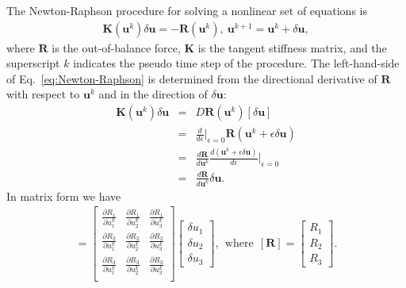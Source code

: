 \documentclass[12pt,aps,pre]{revtex4}
\begin{document}
The Newton-Raphson procedure for solving a nonlinear set of equations is \cite{JavierBonet:2008uxa}
%
\begin{eqnarray}
\pmb{K}(\pmb{u}^k) \delta \pmb{u} = - \pmb{R}(\pmb{u}^k), \ \pmb{u}^{k+1} = \pmb{u}^k + \delta \pmb{u},
\label{eq:Newton-Raphson}
\end{eqnarray}
%
where $\pmb{R}$ is the out-of-balance force, $\pmb{K}$ is the tangent stiffness matrix, and the superscript $k$ indicates the pseudo time step of the procedure. The left-hand-side of  Eq.\ \eqref{eq:Newton-Raphson} is determined from the directional derivative of $\pmb{R}$ with respect to $\pmb{u}^k$ and in the direction of $\delta \pmb{u}$:
%
\begin{eqnarray}
\pmb{K}(\pmb{u}^k) \delta \pmb{u} &=& D\pmb{R}(\pmb{u}^k)[\delta \pmb{u}] \nonumber\\
%
&=& \frac{d}{d\epsilon} \bigg|_{\epsilon=0}\pmb{R}(\pmb{u}^k + \epsilon \delta \pmb{u}) \nonumber\\
&=& \frac{d \pmb{R}}{d\pmb{u}^k} \frac{d(\pmb{u}^k + \epsilon \delta \pmb{u})}{d\epsilon} \bigg|_{\epsilon=0} \nonumber\\
&=& \frac{d \pmb{R}}{d\pmb{u}^k} \delta \pmb{u}.
\label{eq:DR[u]}
\end{eqnarray}
%
In matrix form we have
%
\begin{eqnarray}
[\pmb{K}(\pmb{u}^k)][\delta \pmb{u}] =
%
\begin{bmatrix}
\frac{\partial R_1}{\partial u_1^k} & \frac{\partial R_1}{\partial u_2^k} & \frac{\partial R_1}{\partial u_3^k} \\
%
\frac{\partial R_2}{\partial u_1^k} & \frac{\partial R_2}{\partial u_2^k} & \frac{\partial R_2}{\partial u_3^k} \\
%
\frac{\partial R_3}{\partial u_1^k} & \frac{\partial R_3}{\partial u_2^k} & \frac{\partial R_3}{\partial u_3^k} \\
\end{bmatrix}
%
\begin{bmatrix}
\delta u_1 \\ \delta u_2 \\ \delta u_3
\end{bmatrix}, \ \ \text{where} \ \ 
%
[\pmb{R}] = 
\begin{bmatrix}
R_1 \\ R_2 \\ R_3
\end{bmatrix}.
\label{eq:DR[u]_matrix}
\end{eqnarray}
%
\end{document}
